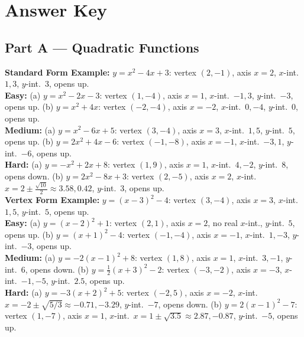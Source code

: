 \documentclass[11pt]{article}
\begin{document}
\section*{Answer Key}

\subsection*{Part A --- Quadratic Functions}
{\small
\textbf{Standard Form Example:} $y=x^2-4x+3$: vertex $(2,-1)$, axis $x=2$, $x$-int.\ $1,3$, $y$-int.\ $3$, opens up.\\[1mm]
\textbf{Easy:} (a) $y=x^2-2x-3$: vertex $(1,-4)$, axis $x=1$, $x$-int.\ $-1,3$, $y$-int.\ $-3$, opens up.
\quad (b) $y=x^2+4x$: vertex $(-2,-4)$, axis $x=-2$, $x$-int.\ $0,-4$, $y$-int.\ $0$, opens up.\\[1mm]
\textbf{Medium:} (a) $y=x^2-6x+5$: vertex $(3,-4)$, axis $x=3$, $x$-int.\ $1,5$, $y$-int.\ $5$, opens up.
\quad (b) $y=2x^2+4x-6$: vertex $(-1,-8)$, axis $x=-1$, $x$-int.\ $-3,1$, $y$-int.\ $-6$, opens up.\\[1mm]
\textbf{Hard:} (a) $y=-x^2+2x+8$: vertex $(1,9)$, axis $x=1$, $x$-int.\ $4,-2$, $y$-int.\ $8$, opens down.
\quad (b) $y=2x^2-8x+3$: vertex $(2,-5)$, axis $x=2$, $x$-int.\ $x=2\pm\frac{\sqrt{10}}{2}\approx 3.58, 0.42$, $y$-int.\ $3$, opens up.\\[3mm]

\textbf{Vertex Form Example:} $y=(x-3)^2-4$: vertex $(3,-4)$, axis $x=3$, $x$-int.\ $1,5$, $y$-int.\ $5$, opens up.\\[1mm]
\textbf{Easy:} (a) $y=(x-2)^2+1$: vertex $(2,1)$, axis $x=2$, no real $x$-int., $y$-int.\ $5$, opens up.
\quad (b) $y=(x+1)^2-4$: vertex $(-1,-4)$, axis $x=-1$, $x$-int.\ $1,-3$, $y$-int.\ $-3$, opens up.\\[1mm]
\textbf{Medium:} (a) $y=-2(x-1)^2+8$: vertex $(1,8)$, axis $x=1$, $x$-int.\ $3,-1$, $y$-int.\ $6$, opens down.
\quad (b) $y=\tfrac12(x+3)^2-2$: vertex $(-3,-2)$, axis $x=-3$, $x$-int.\ $-1,-5$, $y$-int.\ $2.5$, opens up.\\[1mm]
\textbf{Hard:} (a) $y=-3(x+2)^2+5$: vertex $(-2,5)$, axis $x=-2$, $x$-int.\ $x=-2\pm\sqrt{5/3}\approx-0.71,-3.29$, $y$-int.\ $-7$, opens down.
\quad (b) $y=2(x-1)^2-7$: vertex $(1,-7)$, axis $x=1$, $x$-int.\ $x=1\pm\sqrt{3.5}\approx2.87,-0.87$, $y$-int.\ $-5$, opens up.\\[3mm]

}
\end{document}
